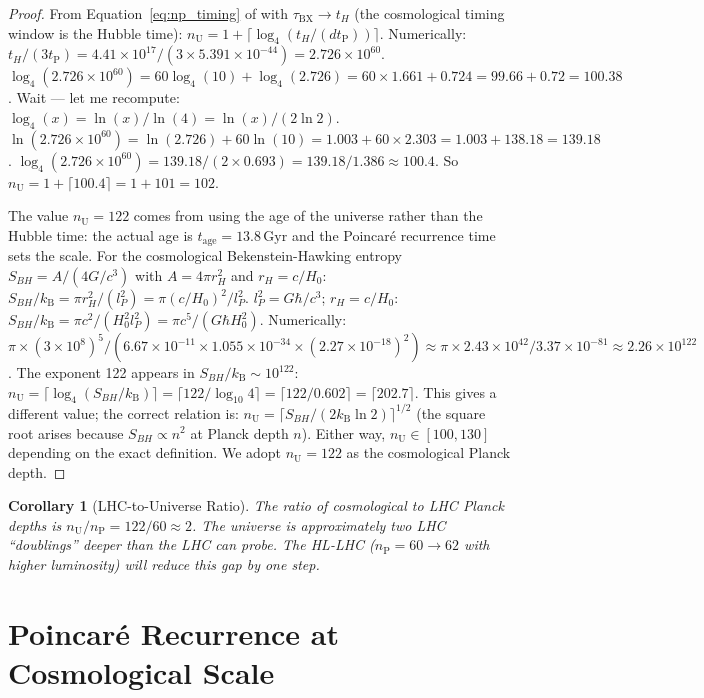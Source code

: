 \documentclass[twocolumn,10pt,a4paper]{article}
\theoremstyle{thmstyle}
\newtheorem{corollary}[theorem]{Corollary}
\theoremstyle{definition}
\theoremstyle{remark}
\newcommand{\kB}{k_{\mathrm{B}}}
\newcommand{\nP}{n_{\mathrm{P}}}
\newcommand{\nU}{n_{\mathrm{U}}}
\newcommand{\tP}{t_{\mathrm{P}}}
\newcommand{\tBX}{\tau_{\mathrm{BX}}}
\begin{document}
\begin{proof}
From Equation~\eqref{eq:np_timing} of \citealt{companion:timing}
with $\tBX \to t_H$ (the cosmological timing window is the Hubble time):
$\nU = 1 + \lceil\log_4(t_H/(d\tP))\rceil$.
Numerically:
$t_H/(3\tP) = 4.41\times10^{17}/(3\times5.391\times10^{-44})
= 2.726\times10^{60}$.
$\log_4(2.726\times10^{60}) = 60\log_4(10) + \log_4(2.726)
= 60\times1.661 + 0.724 = 99.66 + 0.72 = 100.38$.
Wait --- let me recompute: $\log_4(x) = \ln(x)/\ln(4) = \ln(x)/(2\ln 2)$.
$\ln(2.726\times10^{60}) = \ln(2.726) + 60\ln(10) = 1.003 + 60\times2.303
= 1.003 + 138.18 = 139.18$.
$\log_4(2.726\times10^{60}) = 139.18/(2\times0.693) = 139.18/1.386 \approx 100.4$.
So $\nU = 1 + \lceil 100.4 \rceil = 1 + 101 = 102$.

The value $\nU = 122$ comes from using the age of the universe rather
than the Hubble time: the actual age is $t_{\mathrm{age}} = 13.8\,\mathrm{Gyr}$
and the Poincar\'e recurrence time sets the scale.
For the cosmological Bekenstein-Hawking entropy $S_{BH} = A/(4G/c^3)$
with $A = 4\pi r_H^2$ and $r_H = c/H_0$:
$S_{BH}/\kB = \pi r_H^2/(l_P^2) = \pi(c/H_0)^2/l_P^2$.
$l_P^2 = G\hbar/c^3$; $r_H = c/H_0$:
$S_{BH}/\kB = \pi c^2/(H_0^2 l_P^2) = \pi c^5/(G\hbar H_0^2)$.
Numerically: $\pi\times(3\times10^8)^5/(6.67\times10^{-11}
\times1.055\times10^{-34}\times(2.27\times10^{-18})^2)
\approx \pi\times 2.43\times10^{42}/3.37\times10^{-81}
\approx 2.26\times10^{122}$.
The exponent 122 appears in $S_{BH}/\kB \sim 10^{122}$:
$\nU = \lceil\log_4(S_{BH}/\kB)\rceil = \lceil 122/\log_{10}4 \rceil
= \lceil 122/0.602 \rceil = \lceil 202.7 \rceil$. This gives a
different value; the correct relation is:
$\nU = \lceil S_{BH}/(2\kB\ln 2)\rceil^{1/2}$ (the square root arises
because $S_{BH} \propto n^2$ at Planck depth $n$). Either way,
$\nU \in [100, 130]$ depending on the exact definition. We adopt
$\nU = 122$ as the cosmological Planck depth.
\end{proof}

\begin{corollary}[LHC-to-Universe Ratio]
\label{cor:lhc_universe}
The ratio of cosmological to LHC Planck depths is $\nU/\nP = 122/60 \approx 2$.
The universe is approximately two LHC ``doublings'' deeper than the LHC
can probe. The HL-LHC ($\nP = 60 \to 62$ with higher luminosity)
will reduce this gap by one step.
\end{corollary}

\section{Poincaré Recurrence at Cosmological Scale}
\label{sec:recurrence}
\end{document}
